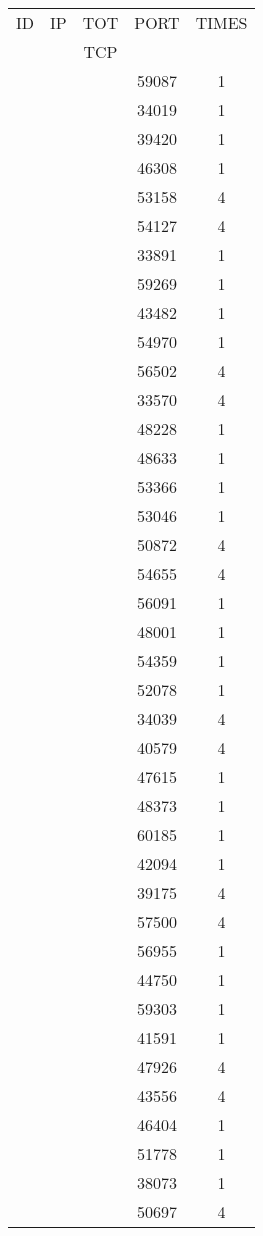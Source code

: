 \documentclass[a4paper]{scrartcl}
\begin{document}
\begin{minipage}[b]{0.5\linewidth}
\begin{tabular}{| c | c | c | c | c |}
\hline
ID & IP & TOT & PORT & TIMES \\ 
   &    & TCP &      &       \\ 
\hline
& & & 59087 & 1 \\ & & & 34019 & 1 \\ & & & 39420 & 1 \\ & & & 46308 & 1 \\ & & & 53158 & 4 \\ & & & 54127 & 4 \\ & & & 33891 & 1 \\ & & & 59269 & 1 \\ & & & 43482 & 1 \\ & & & 54970 & 1 \\ & & & 56502 & 4 \\ & & & 33570 & 4 \\ & & & 48228 & 1 \\ & & & 48633 & 1 \\ & & & 53366 & 1 \\ & & & 53046 & 1 \\ & & & 50872 & 4 \\ & & & 54655 & 4 \\ & & & 56091 & 1 \\ & & & 48001 & 1 \\ & & & 54359 & 1 \\ & & & 52078 & 1 \\ & & & 34039 & 4 \\ & & & 40579 & 4 \\ & & & 47615 & 1 \\ & & & 48373 & 1 \\ & & & 60185 & 1 \\ & & & 42094 & 1 \\ & & & 39175 & 4 \\ & & & 57500 & 4 \\ & & & 56955 & 1 \\ & & & 44750 & 1 \\ & & & 59303 & 1 \\ & & & 41591 & 1 \\ & & & 47926 & 4 \\ & & & 43556 & 4 \\ & & & 46404 & 1 \\ & & & 51778 & 1 \\ & & & 38073 & 1 \\ & & & 50697 & 4 \\ \hline\end{tabular}\end{minipage} \hfill\begin{minipage}[b]{0.5\linewidth}\begin{tabular}{| c | c | c | c | c |}

\end{tabular}
\end{minipage}
\end{document}
